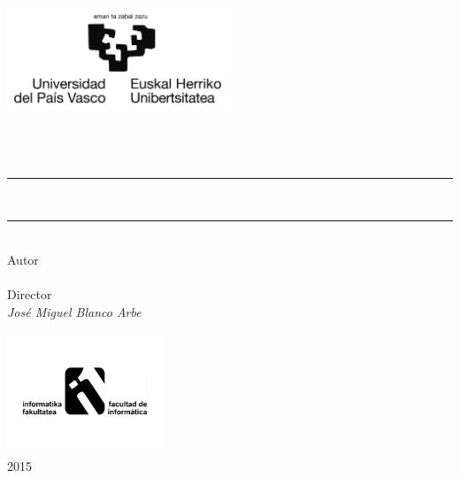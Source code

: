 \thispagestyle{empty}

\newcommand{\HRule}{\rule{\linewidth}{0.5mm}} 

\begin{center}
  \includegraphics[width=0.5\textwidth]{template/figs/ehu-logo-osoa.jpg} \\[1.3cm]
   {\Large \gradua}\\
   {\espezialitatea}\\[1.5cm]

  {\large {\gapizenburua}}\\[0.2cm]
\HRule \\[0.5cm]

{ \LARGE 
\begin{spacing}{1}
  \textbf{\izenburua}
\end{spacing}
}
 \vspace{0.5cm}
\HRule \\[2.0cm]

{ Autor \\}
{\Large \textsl{\egilea \\}}
{ Director \\}
{\Large \textsl{José Miguel Blanco Arbe}}
\vspace{1.0 cm} 

\includegraphics[width=0.35\textwidth]{template/figs/logo_infor.pdf} \\[0.1cm]
{\large \textsf{2015}}

\end{center}

